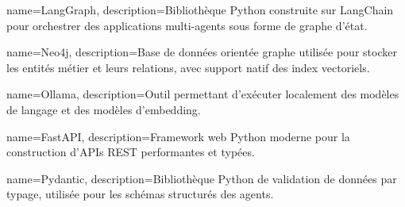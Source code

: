 
{
    name={LangGraph},
    description={Bibliothèque Python construite sur LangChain pour orchestrer des applications multi-agents sous forme de graphe d'état.}
}

{
    name={Neo4j},
    description={Base de données orientée graphe utilisée pour stocker les entités métier et leurs relations, avec support natif des index vectoriels.}
}

{
    name={Ollama},
    description={Outil permettant d'exécuter localement des modèles de langage et des modèles d'embedding.}
}

{
    name={FastAPI},
    description={Framework web Python moderne pour la construction d'APIs REST performantes et typées.}
}

{
    name={Pydantic},
    description={Bibliothèque Python de validation de données par typage, utilisée pour les schémas structurés des agents.}
}
